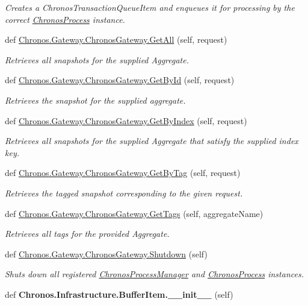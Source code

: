 \begin{DoxyCompactItemize}
\begin{DoxyCompactList}\small\item\em Creates a Chronos\+Transaction\+Queue\+Item and enqueues it for processing by the correct \hyperlink{classChronos_1_1Gateway_1_1ChronosProcess}{Chronos\+Process} instance. \end{DoxyCompactList}\item 
def \hyperlink{group__Chronos_gab8200236e0e382a3f1fa576190267513}{Chronos.\+Gateway.\+Chronos\+Gateway.\+Get\+All} (self, request)
\begin{DoxyCompactList}\small\item\em Retrieves all snapshots for the supplied Aggregate. \end{DoxyCompactList}\item 
def \hyperlink{group__Chronos_ga1dd0cc5ef184d3634b482e16bdfaaffe}{Chronos.\+Gateway.\+Chronos\+Gateway.\+Get\+By\+Id} (self, request)
\begin{DoxyCompactList}\small\item\em Retrieves the snapshot for the supplied aggregate. \end{DoxyCompactList}\item 
def \hyperlink{group__Chronos_ga46ee58f34474277a9b54d3e1814c8115}{Chronos.\+Gateway.\+Chronos\+Gateway.\+Get\+By\+Index} (self, request)
\begin{DoxyCompactList}\small\item\em Retrieves all snapshots for the supplied Aggregate that satisfy the supplied index key. \end{DoxyCompactList}\item 
def \hyperlink{group__Chronos_ga3abe9fb6af06ad9e1cce2a645624dbbe}{Chronos.\+Gateway.\+Chronos\+Gateway.\+Get\+By\+Tag} (self, request)
\begin{DoxyCompactList}\small\item\em Retrieves the tagged snapshot corresponding to the given request. \end{DoxyCompactList}\item 
def \hyperlink{group__Chronos_ga66539ba88e0de9efc24890c09a720b7e}{Chronos.\+Gateway.\+Chronos\+Gateway.\+Get\+Tags} (self, aggregate\+Name)
\begin{DoxyCompactList}\small\item\em Retrieves all tags for the provided Aggregate. \end{DoxyCompactList}\item 
def \hyperlink{group__Chronos_gafce09c1b25233cee3a27f22c1073896e}{Chronos.\+Gateway.\+Chronos\+Gateway.\+Shutdown} (self)
\begin{DoxyCompactList}\small\item\em Shuts down all registered \hyperlink{classChronos_1_1Gateway_1_1ChronosProcessManager}{Chronos\+Process\+Manager} and \hyperlink{classChronos_1_1Gateway_1_1ChronosProcess}{Chronos\+Process} instances. \end{DoxyCompactList}\item 
def {\bfseries Chronos.\+Infrastructure.\+Buffer\+Item.\+\_\+\+\_\+init\+\_\+\+\_\+} (self)\hypertarget{group__Chronos_gaf8de5d661f42c31527e3e5356cd08b00}{}\label{group__Chronos_gaf8de5d661f42c31527e3e5356cd08b00}


\end{DoxyCompactItemize}
